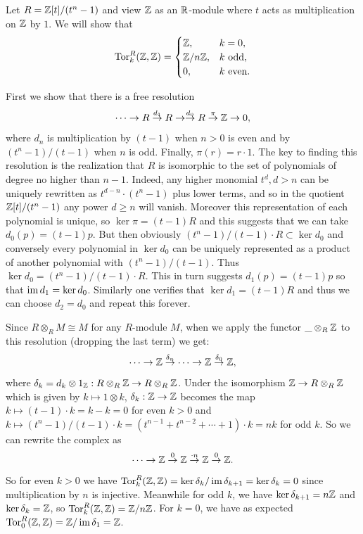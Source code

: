 \begin{example}\label{example Tor with R=Z[t]/(tn-1)}
    Let $R=\mathbb{Z}[t]\slash(t^n-1)$ and view $\mathbb{Z}$ as an $\mathbb{R}$-module where $t$ acts as multiplication on $\mathbb{Z}$ by $1$. We will show that
        \[\operatorname{Tor}_k^R(\mathbb{Z},\mathbb{Z})=\begin{cases}
            \mathbb{Z},&k=0,\\
            \mathbb{Z}\slash n\mathbb{Z},&k\text{ odd},\\
            0,& k\text{ even}.
        \end{cases}\]

    First we show that there is a free resolution
    \[\cdots\to R\overset{d_1}{\to}R\to \overset{d_0}{\to}R \overset{\pi}{\to}\mathbb{Z}\to 0,\]
    where $d_n$ is multiplication by $(t-1)$ when $n>0$ is even and by $(t^n-1)/(t-1)$ when $n$ is odd. Finally, $\pi(r)=r\cdot 1$. The key to finding this resolution is the realization that $R$ is isomorphic to the set of polynomials of degree no higher than $n-1$. Indeed, any higher monomial $t^d, d>n$ can be uniquely rewritten as $t^{d-n}\cdot (t^n-1)$ plus lower terms, and so in the quotient $\mathbb{Z}[t]/(t^n-1)$ any power $d\geq n$ will vanish. Moreover this representation of each polynomial is unique, so $\ker\pi =(t-1)R$ and this suggests that we can take $d_0(p)=(t-1)p$. But then obviously $(t^n-1)/(t-1)\cdot R\subset \ker d_0$ and conversely every polynomial in $\ker d_0$ can be uniquely represented as a product of another polynomial with $(t^n-1)/(t-1)$. Thus $\ker d_0=(t^n-1)/(t-1)\cdot R$. This in turn suggests $d_1(p)=(t-1)p$ so that $\operatorname{im} d_1=\ker d_0$. Similarly one verifies that $\ker d_1=(t-1)R$ and thus we can choose $d_2=d_0$ and repeat this forever.

    Since $R\otimes_R M\cong M$ for any $R$-module $M$, when we apply the functor $\_\otimes_R \mathbb{Z}$ to this resolution (dropping the last term) we get:
    \[\cdots\to \mathbb{Z} \overset{\delta_n}{\to}\cdots \to \mathbb{Z}\overset{\delta_0}{\to}\mathbb{Z},\]
    where $\delta_k=d_k\otimes 1_{\mathbb{Z}}: R\otimes_R\mathbb{Z}\to R\otimes_R\mathbb{Z}$. Under the isomorphism $\mathbb{Z}\to R\otimes_R\mathbb{Z}$ which is given by $k\mapsto 1\otimes k$, $\delta_k:\mathbb{Z}\to \mathbb{Z}$  becomes the map $k\mapsto (t-1)\cdot k=k-k=0$ for even $k>0$ and $k\mapsto (t^n-1)/(t-1)\cdot k=(t^{n-1}+t^{n-2}+\cdots +1)\cdot k=nk$ for odd $k$. So we can rewrite the complex as
    \[\cdots\to \mathbb{Z}\overset{0}{\to}\mathbb{Z}\overset{\cdot n}{\to}\mathbb{Z}\overset{0}{\to}\mathbb{Z}.\]
    So for even $k>0$ we have $\operatorname{Tor}_k^R(\mathbb{Z},\mathbb{Z})=\ker\delta_k\slash\operatorname{im}\delta_{k+1}=\ker\delta_k=0$ since multiplication by $n$ is injective. Meanwhile for odd $k$, we have $\ker\delta_{k+1}=n\mathbb{Z}$ and $\ker \delta_k=\mathbb{Z}$, so $\operatorname{Tor}^R_k(\mathbb{Z},\mathbb{Z})=\mathbb{Z}\slash n\mathbb{Z}$. For $k=0$, we have as expected $\operatorname{Tor}_0^R(\mathbb{Z},\mathbb{Z})=\mathbb{Z}\slash \operatorname{im}\delta_1=\mathbb{Z}$.
\end{example}


